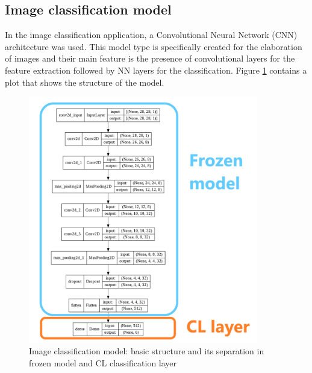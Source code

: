 \documentclass[12pt]{report}
\begin{document}
\subsection{Image classification model}
In the image classification application, a Convolutional Neural Network (CNN) architecture was used. This model type is specifically created for the elaboration of images and their main feature is the presence of convolutional layers for the feature extraction followed by NN layers for the classification. Figure \ref{fig:openmv_structure} contains a plot that shows the structure of the model.\\

\begin{figure}[h!]
    \centering
    \includegraphics[width=100mm]{Figures/Chapter4/openmv_structure.png} 
    \caption{Image classification model: basic structure and its separation in frozen model and CL classification layer}
    \label{fig:openmv_structure}    
\end{figure}
\end{document}
